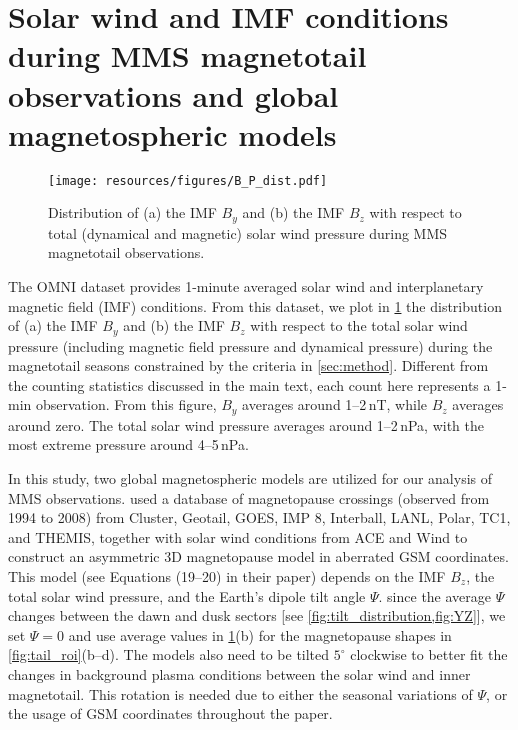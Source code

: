 \documentclass[draft]{agujournal2019}
\begin{document}
\section{Solar wind and IMF conditions during MMS magnetotail observations and global magnetospheric models}\label{appendix:omni}

\begin{figure}
\centering
\noindent\texttt{[image: resources/figures/B\_P\_dist.pdf]}
\caption{
Distribution of (a) the IMF $B_y$ and (b) the IMF $B_z$ with respect to total (dynamical and magnetic) solar wind pressure during MMS magnetotail observations.
}
\label{fig:omni}
\end{figure}

The OMNI dataset \cite{King2005} provides 1-minute averaged solar wind and interplanetary magnetic field (IMF) conditions. From this dataset, we plot in \cref{fig:omni} the distribution of (a) the IMF $B_y$ and (b) the IMF $B_z$ with respect to the total solar wind pressure (including magnetic field pressure and dynamical pressure) during the magnetotail seasons constrained by the criteria in \cref{sec:method}. Different from the counting statistics discussed in the main text, each count here represents a 1-min observation. From this figure, $B_y$ averages around 1--2\,\si{nT}, while $B_z$ averages around zero. The total solar wind pressure averages around 1--2\,\si{nPa}, with the most extreme pressure around 4--5\,\si{nPa}.

In this study, two global magnetospheric models are utilized for our analysis of MMS observations.  used a database of magnetopause crossings (observed from 1994 to 2008) from Cluster, Geotail, GOES, IMP 8, Interball, LANL, Polar, TC1, and THEMIS, together with solar wind conditions from ACE and Wind to construct an asymmetric 3D magnetopause model in aberrated GSM coordinates. This model (see Equations (19--20) in their paper) depends on the IMF $B_z$, the total solar wind pressure, and the Earth's dipole tilt angle $\Psi$. since the average $\Psi$ changes between the dawn and dusk sectors [see \cref{fig:tilt_distribution,fig:YZ}], we set $\Psi=0$ and use average values in \cref{fig:omni}(b) for the magnetopause shapes in \cref{fig:tail_roi}(b--d). The models also need to be tilted $5^\circ$ clockwise to better fit the changes in background plasma conditions between the solar wind and inner magnetotail. This rotation is needed due to either the seasonal variations of $\Psi$, or the usage of GSM coordinates throughout the paper.
\end{document}
